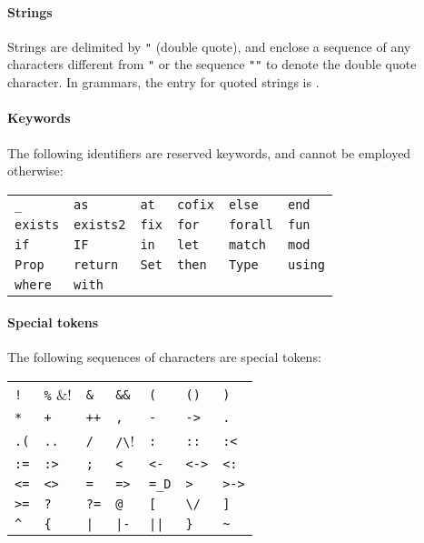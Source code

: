 \paragraph{Strings}
\label{strings}
Strings are delimited by \verb!"! (double quote), and enclose a
sequence of any characters different from \verb!"! or the sequence
\verb!""! to denote the double quote character. In grammars, the
entry for quoted strings is {\qstring}.

\paragraph{Keywords}
The following identifiers are reserved keywords, and cannot be
employed otherwise:
\begin{center}
\begin{tabular}{llllll}
\verb!_!          &
\verb!as!         &
\verb!at!         &
\verb!cofix!      &
\verb!else!       &
\verb!end!        \\
%
\verb!exists!     &
\verb!exists2!    &
\verb!fix!        &
\verb!for!        &
\verb!forall!     &
\verb!fun!        \\
%
\verb!if!         &
\verb!IF!         &
\verb!in!         &
\verb!let!        &
\verb!match!      &
\verb!mod!        \\
%
\verb!Prop!       &
\verb!return!     &
\verb!Set!        &
\verb!then!       &
\verb!Type!       &
\verb!using!      \\
%
\verb!where!      &
\verb!with!       &
\end{tabular}
\end{center}


\paragraph{Special tokens}
The following sequences of characters are special tokens:
\begin{center}
\begin{tabular}{lllllll}
\verb/!/   &
\verb!%!  &
\verb!&!   &
\verb!&&!  &
\verb!(!   &
\verb!()!  &
\verb!)!   \\
%
\verb!*!   &
\verb!+!   &
\verb!++!  &
\verb!,!   &
\verb!-!   &
\verb!->!  &
\verb!.!   \\
%
\verb!.(!  &
\verb!..!  &
\verb!/!   &
\verb!/\!  &
\verb!:!   &
\verb!::!  &
\verb!:<!  \\
%
\verb!:=!  &
\verb!:>!  &
\verb!;!   &
\verb!<!   &
\verb!<-!  &
\verb!<->! &
\verb!<:!  \\
%
\verb!<=!  &
\verb!<>!  &
\verb!=!   &
\verb!=>!  &
\verb!=_D! &
\verb!>!   &
\verb!>->! \\
%
\verb!>=!  &
\verb!?!   &
\verb!?=!  &
\verb!@!   &
\verb![!   &
\verb!\/!  &
\verb!]!   \\
%
\verb!^!   &
\verb!{!   &
\verb!|!   &
\verb!|-!  &
\verb!||!  &
\verb!}!   &
\verb!~!   \\
\end{tabular}
\end{center}

